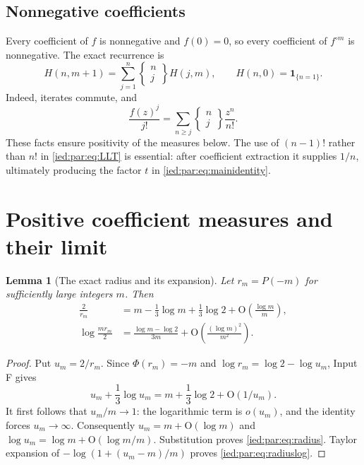 \documentclass[11pt,letterpaper]{article}
\newtheorem{lemma}[theorem]{Lemma}
\theoremstyle{remark}\newtheorem{remark}[theorem]{Remark}
\newcommand{\Oh}{\mathrm O}\newcommand{\supp}{\operatorname{supp}}
\begin{document}
\subsection{Nonnegative coefficients}
Every coefficient of $f$ is nonnegative and $f(0)=0$, so every
coefficient of $f^{\circ m}$ is nonnegative. The exact recurrence is
\begin{equation}\label{ied:par:eq:Hrec}
 H(n,m+1)=\sum_{j=1}^{n}
 \left\{\begin{matrix}n\\j\end{matrix}\right\}H(j,m),
 \qquad H(n,0)=\mathbf1_{\{n=1\}}.
\end{equation}
Indeed, iterates commute, and
\[
 \frac{f(z)^j}{j!}=
 \sum_{n\ge j}\left\{\begin{matrix}n\\j\end{matrix}\right\}
 \frac{z^n}{n!}.
\]
These facts ensure positivity of the measures below. The use of
$(n-1)!$ rather than $n!$ in \eqref{ied:par:eq:LLT} is essential: after coefficient
extraction it supplies $1/n$, ultimately producing the factor $t$
in \eqref{ied:par:eq:mainidentity}.

\section{Positive coefficient measures and their limit}\label{ied:par:sec:measures}

\begin{lemma}[The exact radius and its expansion]\label{ied:par:lem:radius}
Let $r_m=P(-m)$ for sufficiently large integers $m$. Then
\begin{align}
 \frac2{r_m}
 &=m-\frac13\log m+\frac13\log2
 +\Oh\!\left(\frac{\log m}{m}\right),\label{ied:par:eq:radius}\\
 \log\frac{mr_m}{2}
 &=\frac{\log m-\log2}{3m}
 +\Oh\!\left(\frac{(\log m)^2}{m^2}\right).\label{ied:par:eq:radiuslog}
\end{align}
\end{lemma}
\begin{proof}
Put $u_m=2/r_m$. Since $\Phi(r_m)=-m$ and
$\log r_m=\log2-\log u_m$, Input F gives
\[
 u_m+\frac13\log u_m=m+\frac13\log2+\Oh(1/u_m).
\]
It first follows that $u_m/m\to1$: the logarithmic term is $o(u_m)$,
and the identity forces $u_m\to\infty$. Consequently
$u_m=m+\Oh(\log m)$ and $\log u_m=\log m+\Oh(\log m/m)$.
Substitution proves \eqref{ied:par:eq:radius}. Taylor expansion of
$-\log(1+(u_m-m)/m)$ proves \eqref{ied:par:eq:radiuslog}.
\end{proof}
\end{document}
